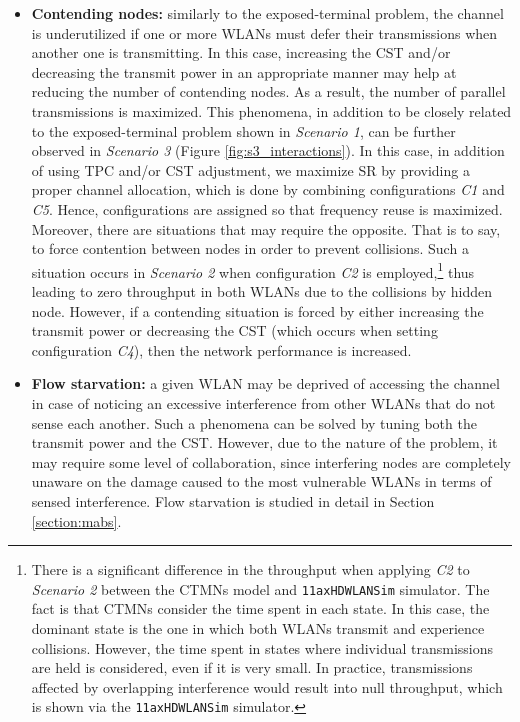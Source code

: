 \documentclass[preprint,12pt]{elsarticle}
\begin{document}
\begin{itemize}
	\item \textbf{Contending nodes:} similarly to the exposed-terminal problem, the channel is underutilized if one or more WLANs must defer their transmissions when another one is transmitting. In this case, increasing the CST and/or decreasing the transmit power in an appropriate manner may help at reducing the number of contending nodes. As a result, the number of parallel transmissions is maximized. This phenomena, in addition to be closely related to the exposed-terminal problem shown in \emph{Scenario 1}, can be further observed in \emph{Scenario 3} (Figure \ref{fig:s3_interactions}). In this case, in addition of using TPC and/or CST adjustment, we maximize SR by providing a proper channel allocation, which is done by combining configurations \emph{C1} and \emph{C5}. Hence, configurations are assigned so that frequency reuse is maximized. Moreover, there are situations that may require the opposite. That is to say, to force contention between nodes in order to prevent collisions. Such a situation occurs in \emph{Scenario 2} when configuration \emph{C2} is employed,\footnote{There is a significant difference in the throughput when applying \emph{C2} to \emph{Scenario 2} between the CTMNs model and \texttt{11axHDWLANSim} simulator. The fact is that CTMNs consider the time spent in each state. In this case, the dominant state is the one in which both WLANs transmit and experience collisions. However, the time spent in states where individual transmissions are held is considered, even if it is very small. In practice, transmissions affected by overlapping interference would result into null throughput, which is shown via the \texttt{11axHDWLANSim} simulator.} thus leading to zero throughput in both WLANs due to the collisions by hidden node. However, if a contending situation is forced by either increasing the transmit power or decreasing the CST (which occurs when setting configuration \emph{C4}), then the network performance is increased. 		
	\item \textbf{Flow starvation:} a given WLAN may be deprived of accessing the channel in case of noticing an excessive interference from other WLANs that do not sense each another. Such a phenomena can be solved by tuning both the transmit power and the CST. However, due to the nature of the problem, it may require some level of collaboration, since interfering nodes are completely unaware on the damage caused to the most vulnerable WLANs in terms of sensed interference. Flow starvation is studied in detail in Section \ref{section:mabs}.

\end{itemize}
\end{document}
